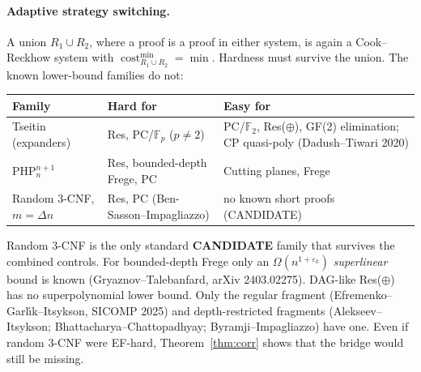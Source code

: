 \documentclass[11pt]{article}
\theoremstyle{definition}
\newcommand{\cost}{\operatorname{cost}}
\begin{document}
\paragraph{Adaptive strategy switching.}
A union $R_1\cup R_2$, where a proof is a proof in either system, is again a
Cook--Reckhow system with $\cost^{\min}_{R_1\cup R_2}=\min$. Hardness must survive the
union. The known lower-bound families do not:
\begin{center}
\begin{tabular}{lll}\toprule
Family & Hard for & Easy for\\\midrule
Tseitin (expanders) & Res, PC/$\mathbb F_p$ ($p\ne2$) & PC/$\mathbb F_2$, Res($\oplus$), GF(2) elimination; CP quasi-poly (Dadush--Tiwari 2020)\\
PHP$^{n+1}_n$ & Res, bounded-depth Frege, PC & Cutting planes, Frege\\
Random 3-CNF, $m=\Delta n$ & Res, PC (Ben-Sasson--Impagliazzo) & no known short proofs (CANDIDATE)\\\bottomrule
\end{tabular}
\end{center}
Random 3-CNF is the only standard \textbf{CANDIDATE} family that survives the combined
controls. For bounded-depth Frege only an $\Omega(n^{1+\varepsilon_k})$ \emph{superlinear}
bound is known (Gryaznov--Talebanfard, arXiv 2403.02275). DAG-like Res($\oplus$) has no
superpolynomial lower bound. Only the regular fragment (Efremenko--Garl\'{\i}k--Itsykson,
SICOMP 2025) and depth-restricted fragments (Alekseev--Itsykson; Bhattacharya--Chattopadhyay;
Byramji--Impagliazzo) have one. Even if random 3-CNF were EF-hard, Theorem~\ref{thm:corr}
shows that the bridge would still be missing.
\end{document}
